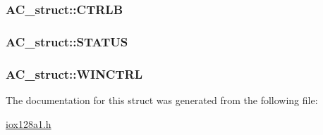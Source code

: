 \label{struct_a_c__struct_aba3a132516f20876ebabdfec5110dbb2}
\hypertarget{struct_a_c__struct_a15795c599244a4e81d354e29cd44c1bb}{
\subsubsection[{CTRLB}]{ {\bf AC\_\-struct::CTRLB}}}
\label{struct_a_c__struct_a15795c599244a4e81d354e29cd44c1bb}
\hypertarget{struct_a_c__struct_a151d447d35de8c9678466479ba5f1f4b}{
\subsubsection[{STATUS}]{ {\bf AC\_\-struct::STATUS}}}
\label{struct_a_c__struct_a151d447d35de8c9678466479ba5f1f4b}
\hypertarget{struct_a_c__struct_a7cbcb49f6e967b6dd10d42667fd3aef7}{
\subsubsection[{WINCTRL}]{ {\bf AC\_\-struct::WINCTRL}}}
\label{struct_a_c__struct_a7cbcb49f6e967b6dd10d42667fd3aef7}


The documentation for this struct was generated from the following file:\begin{DoxyCompactItemize}
\item 
\hyperlink{iox128a1_8h}{iox128a1.h}\end{DoxyCompactItemize}
